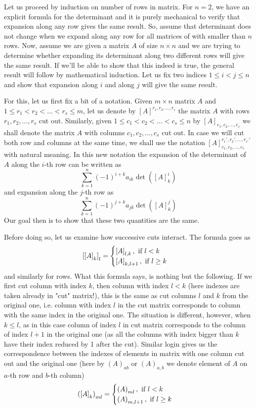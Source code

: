 \documentclass[8pt]{article} %
\begin{document}
Let us proceed by induction on number of rows in matrix.
For $n=2$, we have an explicit formula for the determinant and it is purely mechanical to verify that expansion
along any row gives the same result. So, assume that determinant does not change when we expand along any row for all matrices of with smaller
than $n$ rows. Now,
assume we are given a matrix $A$ of size $n\times n$ and we are trying to determine whether expanding its determinant along two different
rows will give the same result. If we'll be able to show that this indeed is true, the general result will follow by mathematical induction. Let
us fix two indices $1\leq i<j\leq n$ and show that expansion along $i$ and along $j$ will give the same result.

For this, let us first fix a bit of a notation. Given $m\times n$ matrix $A$ and
$1\leq r_1<r_2<\hdots<r_s\leq m$, let us denote by $[A]^{r_1,r_2,\hdots,r_s}$
the matrix $A$ with rows $r_1, r_2,\hdots,r_s$ cut out.
Similarly, given $1\leq c_1<c_2<\hdots<c_s\leq n$
by $[A]_{c_1,c_2,\hdots,c_s}$ we shall denote the matrix $A$ with columns $c_1,c_2,\hdots,c_s$ cut out. In case we will cut both row and columns
at the same time, we shall use the notation $[A]_{c_1,c_2,\hdots,c_s}^{r_1',r_2',\hdots,r_{s'}'}$ with natural meaning. In this new notation the 
expansion of the determinant of $A$ along the $i$-th row can be written as
\[\sum_{k=1}^n(-1)^{i+k}a_{ik}\det([A]_k^i)\]
and expansion along the $j$-th row as
\[\sum_{k=1}^n(-1)^{j+k}a_{jk}\det([A]_k^j)\]
Our goal then is to show that these two quantities are the same.

Before doing so, let us examine how successive cuts interact. The formula goes as
\[\left[\left[A\right]_k\right]_l=\begin{cases}\left[A\right]_{l,k},\mbox{ if }l<k\\\left[A\right]_{k,l+1},\mbox{ if }l\geq k\end{cases}\]
	and similarly for rows. What this formula says, is nothing but the following. If we first cut column with index
	$k$, then column with index $l<k$ (here indexes are taken already in "cut" matrix!), this is the same as cut columns $l$ and $k$ from the 
	original one, i.e. column with index $l$ in the cut matrix corresponds to column with the same index in the original one. The situation is
	different, however, when $k\leq l$, as in this case column of index $l$ in cut matrix corresponds to the column of index
	$l+1$ in the original
	one (as all the columns with index bigger than $k$ have their index reduced by 1 after the cut). Similar login gives us the correspondence
	between the indexes of elements in matrix with one
	column cut out and the original one (here by $(A)_{ab}$ or $(A)_{a,b}$ we denote element of $A$ on $a$-th row and $b$-th 
	column)
	\[\left(\left[A\right]_k\right)_{ml}=\begin{cases}
		\left(A\right)_{ml},\mbox{ if }l<k\\
		\left(A\right)_{m,l+1},\mbox{ if }l\geq k
	\end{cases}\]
\end{document}
